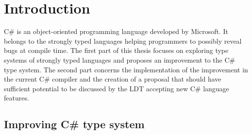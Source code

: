 \chapter{Introduction}

C\# is an object-oriented programming language developed by Microsoft. 
It belongs to the strongly typed languages helping programmers to possibly reveal bugs at compile time. 
The first part of this thesis focuses on exploring type systems of strongly typed languages and proposes an improvement to the C\# type system. 
The second part concerns the implementation of the improvement in the current C\# compiler and the creation of a proposal that should have sufficient potential to be discussed by the \ac{LDT} accepting new C\# language features.

\section{Improving C\# type system} \label{sect01:imprv}


